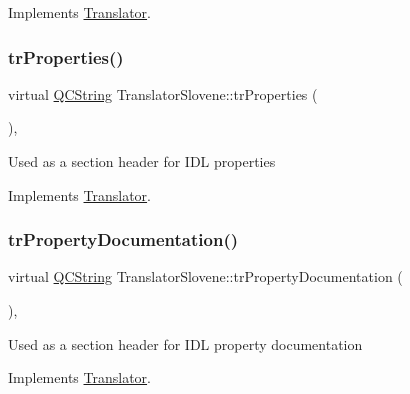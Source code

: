 Implements \mbox{\hyperlink{class_translator}{Translator}}.

\mbox{\label{class_translator_slovene_a3af0518026b0c37dd7faa0fd4a50d942}} 
\subsubsection{\texorpdfstring{trProperties()}{trProperties()}}
{\footnotesize\ttfamily virtual \mbox{\hyperlink{class_q_c_string}{Q\+C\+String}} Translator\+Slovene\+::tr\+Properties (\begin{DoxyParamCaption}{ }\end{DoxyParamCaption})\hspace{0.3cm}{\ttfamily [inline]}, {\ttfamily [virtual]}}

Used as a section header for I\+DL properties 

Implements \mbox{\hyperlink{class_translator}{Translator}}.

\mbox{\label{class_translator_slovene_ae7b3b762024f64c17cfc55fcdf6e501f}} 
\subsubsection{\texorpdfstring{trPropertyDocumentation()}{trPropertyDocumentation()}}
{\footnotesize\ttfamily virtual \mbox{\hyperlink{class_q_c_string}{Q\+C\+String}} Translator\+Slovene\+::tr\+Property\+Documentation (\begin{DoxyParamCaption}{ }\end{DoxyParamCaption})\hspace{0.3cm}{\ttfamily [inline]}, {\ttfamily [virtual]}}

Used as a section header for I\+DL property documentation 

Implements \mbox{\hyperlink{class_translator}{Translator}}.

\mbox{\label{class_translator_slovene_a6abcfed8bae6a4625b22c022116d6e7b}} 
